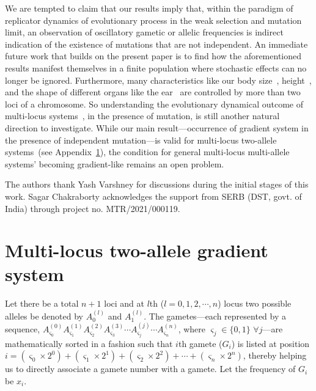 \documentclass[
 pre,
 aps,
 a4paper,
 english,
 showkeys,
 reprint,
 twocolumn,
 superscriptaddress
]{revtex4}
\begin{document}
We are tempted to claim that our results imply that, within the paradigm of replicator dynamics of evolutionary process in the weak selection and mutation limit, an observation of oscillatory gametic or allelic frequencies is indirect indication of the existence of mutations that are not independent. An immediate future work that builds on the present paper is to find how the aforementioned results manifest themselves in a finite population where stochastic effects can no longer be ignored. Furthermore, many characteristics like our body size~\cite{Reed2003genome}, height~\cite{Lettre_2008naturegenetics}, and the shape of different organs like the ear~\cite{Adhikari2015natcommun} are controlled by more than two loci of a chromosome. So understanding the evolutionary dynamical outcome of multi-locus systems~\cite{Zhivotovsky1998genetics,Wray2010genome}, in the presence of mutation, is still another natural direction to investigate. While our main result---occurrence of gradient system in the presence of independent mutation---is valid for multi-locus two-allele systems~(see Appendix~\ref{sec:mlma}), the condition for general multi-locus multi-allele systems' becoming gradient-like remains an open problem.

\acknowledgements
The authors thank Yash Varshney for discussions during the initial stages of this work. Sagar Chakraborty acknowledges the support from SERB (DST, govt. of India) through project no. MTR/2021/000119.

\appendix
\section{Multi-locus two-allele gradient system}
\label{sec:mlma}

Let there be a total $n+1$ loci and at $l$th ($l=0,1,2,\cdots,n$) locus two possible alleles be denoted by $A_0^{(l)}$ and $A_1^{(l)}$. The gametes---each represented by a sequence, $A_{\varsigma_0}^{(0)}A_{\varsigma_1}^{(1)}A_{\varsigma_2}^{(2)}A_{\varsigma_3}^{(3)}\cdots A_{\varsigma_j}^{(j)}\cdots A_{\varsigma_n}^{(n)}$, where $\varsigma_j\in\{0,1\}$ $\forall j$---are mathematically sorted in a fashion such that $i$th gamete ($G_i$) is listed at position $i=(\varsigma_0 \times 2^0)+(\varsigma_1 \times 2^1)+(\varsigma_2 \times 2^2)+\cdots+(\varsigma_n \times 2^n)$, thereby helping us to directly associate a gamete number with a gamete. Let the frequency of $G_i$ be $x_i$. 
\end{document}
